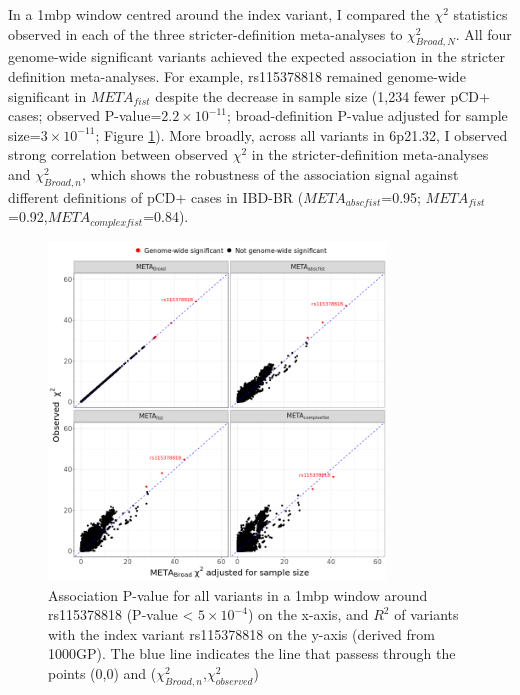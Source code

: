 In a 1mbp window centred around the index variant, I compared the $\chi^{2}$ statistics observed in each of the three stricter-definition meta-analyses to $\chi^{2}_{Broad,N}$. All four genome-wide significant variants achieved the expected association in the stricter definition meta-analyses. For example, rs115378818 remained genome-wide significant in $META_{fist}$ despite the decrease in sample size (1,234 fewer pCD+ cases; observed P-value=$2.2\times10^{-11}$; broad-definition P-value adjusted for sample size=$3\times10^{-11}$; Figure \ref{fig:meta_def_comparison}). More broadly, across all variants in 6p21.32, I observed strong correlation between observed $\chi^{2}$ in the stricter-definition meta-analyses and $\chi^{2}_{Broad,n}$, which shows the robustness of the association signal against different definitions of pCD+ cases in IBD-BR ($META_{abscfist}$=0.95; $META_{fist}$=0.92,$META_{complexfist}$=0.84). 

\begin{figure}[H] 
  \centering    
  \includegraphics[width=0.8\textwidth]{Vector/meta_chisq_plot}
  \caption[Figure]{Association P-value for all variants in a 1mbp window around rs115378818 (P-value < $5\times10^{-4}$) on the x-axis, and $R^{2}$ of variants with the index variant rs115378818 on the y-axis (derived from 1000GP). The blue line indicates the line that passess through the points (0,0) and ($\chi^{2}_{Broad,n}$,$\chi^{2}_{observed}$)}
  \label{fig:meta_def_comparison}
  \end{figure}
